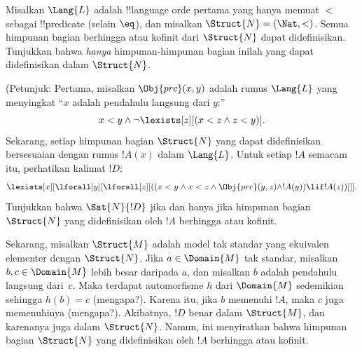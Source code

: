 \documentclass[../../../include/open-logic-section]{subfiles}
\begin{document}
\begin{prob}
Misalkan $\Lang{L}$ adalah !!{language} orde pertama yang hanya memuat $<$
sebagai !!{predicate} (selain $\eq$), dan misalkan $\Struct{N} = (\Nat,
<)$. Semua himpunan bagian berhingga atau kofinit dari $\Struct{N}$ dapat
didefinisikan. Tunjukkan bahwa \emph{hanya} himpunan-himpunan bagian inilah
yang dapat didefinisikan dalam $\Struct{N}$.

(Petunjuk: Pertama, misalkan $\Obj{prc}(x,y)$ adalah rumus $\Lang{L}$ yang
menyingkat ``$x$ adalah pendahulu langsung dari $y$:''
\[
x<y \land \lnot \lexists[z][(x<z \land z < y)].
\]
Sekarang, setiap himpunan bagian $\Struct{N}$ yang dapat didefinisikan
bersesuaian dengan rumus $!A(x)$ dalam $\Lang{L}$. Untuk setiap $!A$ semacam
itu, perhatikan kalimat $!D$:
\[
\lexists[x][\lforall[y][\lforall[z][((x<y \land x<z \land \Obj{prc}(y,z)
  \land !A(y)) \lif !A(z))]]].
\]
Tunjukkan bahwa $\Sat{N}{!D}$ jika dan hanya jika himpunan bagian
$\Struct{N}$ yang didefinisikan oleh $!A$ berhingga atau kofinit.

Sekarang, misalkan $\Struct{M}$ adalah model tak standar yang ekuivalen
elementer dengan $\Struct{N}$. Jika $a \in \Domain{M}$ tak standar,
misalkan $b, c \in \Domain{M}$ lebih besar daripada $a$, dan misalkan $b$
adalah pendahulu langsung dari~$c$. Maka terdapat automorfisme $h$ dari
$\Domain{M}$ sedemikian sehingga $h(b)=c$ (mengapa?). Karena itu, jika $b$
memenuhi $!A$, maka $c$ juga memenuhinya (mengapa?). Akibatnya, $!D$ benar
dalam $\Struct{M}$, dan karenanya juga dalam $\Struct{N}$. Namun, ini
menyiratkan bahwa himpunan bagian $\Struct{N}$ yang didefinisikan oleh $!A$
berhingga atau kofinit.
\end{prob}
\end{document}
